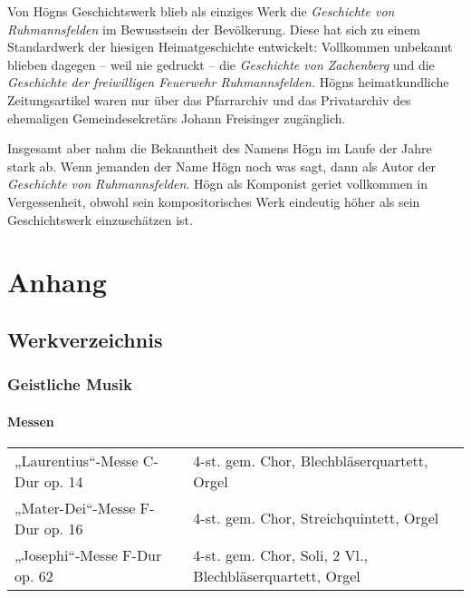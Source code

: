 \documentclass{book}
\begin{document}
Von Högns Geschichtswerk blieb als einziges Werk die \textit{Geschichte
von Ruhmannsfelden} im Bewusstsein der Bevölkerung. Diese hat sich zu
einem Standardwerk der hiesigen Heimatgeschichte entwickelt:
Vollkommen unbekannt blieben dagegen – weil nie gedruckt – die
\textit{Geschichte von Zachenberg} und die \textit{Geschichte der
freiwilligen Feuerwehr Ruhmannsfelden.} Högns heimatkundliche
Zeitungsartikel waren nur über das Pfarrarchiv und das Privatarchiv
des ehemaligen Gemeindesekretärs Johann Freisinger zugänglich.

Insgesamt aber nahm die Bekanntheit des Namens Högn im Laufe der Jahre
stark ab. Wenn jemanden der Name Högn noch was sagt, dann als Autor
der \textit{Geschichte von Ruhmannsfelden}. Högn als Komponist geriet
vollkommen in Vergessenheit, obwohl sein kompositorisches Werk
eindeutig höher als sein Geschichtswerk einzuschätzen ist.





\chapter{Anhang}
\section{Werkverzeichnis}

\subsection{Geistliche Musik}



\subsubsection{Messen}

\begin{tabular}{ll}
„Laurentius“-Messe C-Dur op. 14 &
4-st. gem. Chor, Blechbläserquartett, Orgel\\

„Mater-Dei“-Messe F-Dur op. 16 &
4-st. gem. Chor, Streichquintett, Orgel\\

„Josephi“-Messe F-Dur op. 62 &
4-st. gem. Chor, Soli, 2 Vl., Blechbläserquartett, Orgel\\
\end{tabular}
\end{document}
